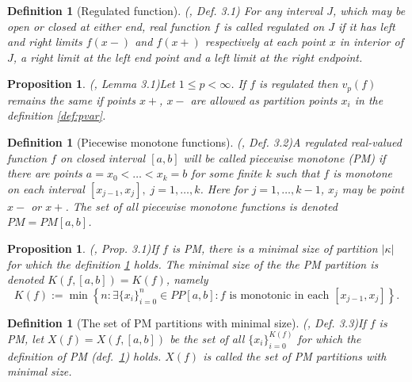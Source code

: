 \documentclass[12pt, a4paper]{article}
\newtheorem{proposition}[theorem]{Proposition}
\newtheorem{definition}[theorem]{Definition}
\numberwithin{equation}{section}
\begin{document}
 

\begin{definition}[Regulated function](\cite{Qian}, Def. 3.1)
  For any interval $J$, which may be open or closed at either end, 
  real function $f$ is called \emph{regulated} on $J$ 
  if it has left and right limits   
  $f(x-)$ and $f(x+)$ respectively at each point $x$ in interior of $J$,
  a right limit at the left end point and a left limit 
  at the right endpoint.
\end{definition}  
 
\begin{proposition}(\cite{Qian}, Lemma 3.1)\label{prop:LimPoints} 
  Let $1 \leq p < \infty$. If $f$ is regulated then $v_{p}(f)$ remains the same
  if points $x+$, $x-$ are allowed as partition points $x_i$ in the definition \ref{def:pvar}.
\end{proposition}  
 
\begin{definition}[Piecewise monotone functions](\cite{Qian}, Def. 3.2)\label{def:PM}
  A regulated real-valued function $f$ on closed interval $[a,b]$ 
  will be called \emph{piecewise monotone} (PM)
  if there are points $a=x_0<\dots<x_k=b$ for some finite $k$ such 
  that $f$ is monotone on each interval $[x_{j-1},x_j],\;j=1,\dots,k$. 
  Here for $j=1,\dots,k-1$, $x_j$ may be point $x-$ or $x+$.
  The set of all piecewise monotone functions is denoted $PM=PM[a,b]$.
\end{definition}   


 
\begin{proposition}(\cite{Qian}, Prop. 3.1)\label{prop:K_f}
  If $f$ is PM, there is a minimal size of partition $|\kappa|$ for which the definition \ref{def:PM} holds.
  The minimal size of the the PM partition is denoted $K(f,[a,b])=K(f)$, namely
  \begin{equation}
  K(f):=\min\left\{n:\exists \{x_{i}\}_{i=0}^{n} \in PP[a,b]:  f \text{ is monotonic in each } [x_{j-1}, x_j]   \right\}.
  \end{equation}
\end{proposition}    
 
\begin{definition}[The set of PM partitions with minimal size](\cite{Qian}, Def. 3.3)\label{def:X_f}
  If $f$ is PM, let $X(f)=X(f,[a,b])$ be the set of all $\{x_{i}\}_{i=0}^{K(f)}$ for which the definition 
  of PM (def.~\ref{def:PM}) holds. $X(f)$ is called the \emph{set of PM partitions with minimal size}.
\end{definition}    
 
\end{document}
